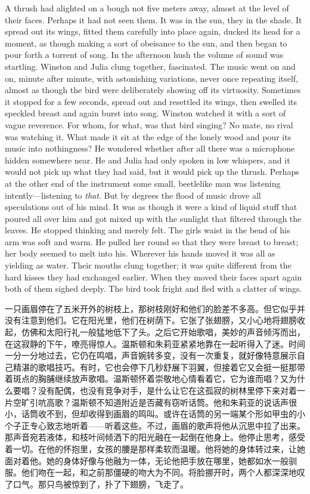 \begin{paracol}{2}
A thrush had alighted on a bough not five meters away, almost at the
level of their faces. Perhaps it had not seen them. It was in the sun,
they in the shade. It spread out its wings, fitted them carefully into
place again, ducked its head for a moment, as though making a sort of
obeisance to the sun, and then began to pour forth a torrent of song. In
the afternoon hush the volume of sound was startling. Winston and Julia
clung together, fascinated. The music went on and on, minute after
minute, with astonishing variations, never once repeating itself, almost
as though the bird were deliberately showing off its virtuosity.
Sometimes it stopped for a few seconds, spread out and resettled its
wings, then swelled its speckled breast and again burst into song.
Winston watched it with a sort of vague reverence. For whom, for what,
was that bird singing? No mate, no rival was watching it. What made it
sit at the edge of the lonely wood and pour its music into nothingness?
He wondered whether after all there was a microphone hidden somewhere
near. He and Julia had only spoken in low whispers, and it would not
pick up what they had said, but it would pick up the thrush. Perhaps at
the other end of the instrument some small, beetlelike man was listening
intently---listening to \emph{that}. But by degrees the flood of music
drove all speculations out of his mind. It was as though it were a kind
of liquid stuff that poured all over him and got mixed up with the
sunlight that filtered through the leaves. He stopped thinking and
merely felt. The girl\textquotesingle s waist in the bend of his arm was
soft and warm. He pulled her round so that they were breast to breast;
her body seemed to melt into his. Wherever his hands moved it was all as
yielding as water. Their mouths clung together; it was quite different
from the hard kisses they had exchanged earlier. When they moved their
faces apart again both of them sighed deeply. The bird took fright and
fled with a clatter of wings.

\switchcolumn

一只画眉停在了五米开外的树枝上，那树枝刚好和他们的脸差不多高。但它似乎并没有注意到他们。它在阳光里，他们在树荫下。它张了张翅膀，又小心地将翅膀收起，仿佛和太阳行礼一般猛地低下了头。之后它开始歌唱，美妙的声音倾泻而出，在这寂静的下午，嘹亮得惊人。温斯顿和朱莉亚紧紧地靠在一起听得入了迷。时间一分一分地过去，它仍在鸣唱，声音婉转多变，没有一次重复，就好像特意展示自己精湛的歌唱技巧。有时，它也会停下几秒舒展下羽翼，但接着它又会挺一挺那带着斑点的胸脯继续放声歌唱。温斯顿怀着崇敬地心情看着它，它为谁而唱？又为什么要唱？没有配偶，也没有竞争对手，是什么让它在这孤寂的树林里停下来对着一片空旷引吭高歌？温斯顿不知道附近是否藏有窃听话筒。他和朱莉亚的说话声很小，话筒收不到，但却收得到画眉的鸣叫。或许在话筒的另一端某个形如甲虫的小个子正专心致志地听着——听着这些。不过，画眉的歌声将他从沉思中拉了出来。那声音宛若液体，和枝叶间倾洒下的阳光融在一起倒在他身上。他停止思考，感受着一切。在他的怀抱里，女孩的腰是那样柔软而温暖。他将她的身体转过来，让她面对着他。她的身体好像与他融为一体，无论他把手放在哪里，她都如水一般驯服。他们吻在一起，和之前那僵硬的吻大为不同。将脸挪开时，两个人都深深地叹了口气。那只鸟被惊到了，扑了下翅膀，飞走了。


\end{paracol}
